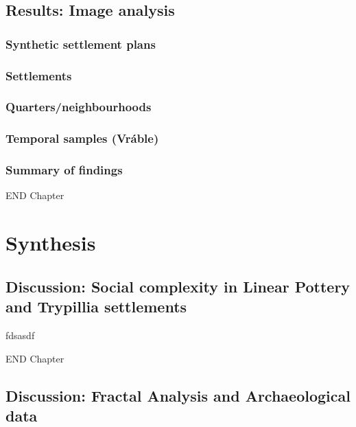 \documentclass[
  12pt,
]{book}
\begin{document}
\hypertarget{images-results}{%
\chapter{Results: Image analysis}\label{images-results}}

\hypertarget{synthetic-settlement-plans}{%
\section{Synthetic settlement plans}\label{synthetic-settlement-plans}}

\hypertarget{settlements-1}{%
\section{Settlements}\label{settlements-1}}

\hypertarget{quartersneighbourhoods-1}{%
\section{Quarters/neighbourhoods}\label{quartersneighbourhoods-1}}

\hypertarget{temporal-samples-vruxe1ble-1}{%
\section{Temporal samples (Vráble)}\label{temporal-samples-vruxe1ble-1}}

\hypertarget{summary-of-findings-1}{%
\section{Summary of findings}\label{summary-of-findings-1}}

END Chapter

\hypertarget{part-synthesis}{%
\part{Synthesis}\label{part-synthesis}}

\hypertarget{disc-results}{%
\chapter{Discussion: Social complexity in Linear Pottery and Trypillia settlements}\label{disc-results}}

fdsasdf

END Chapter

\hypertarget{disc-methods}{%
\chapter{Discussion: Fractal Analysis and Archaeological data}\label{disc-methods}}
\end{document}

